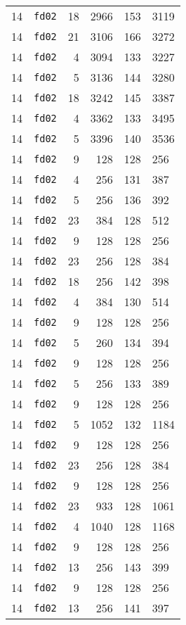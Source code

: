 \documentclass{article}
\begin{document}
\begin{table}[h!]
\begin{tabular}{llrrrl}
    14 & \texttt{fd02} & 18 & 2966 & 153 & 3119 \\
    14 & \texttt{fd02} & 21 & 3106 & 166 & 3272 \\
    14 & \texttt{fd02} & 4 & 3094 & 133 & 3227 \\
    14 & \texttt{fd02} & 5 & 3136 & 144 & 3280 \\
    14 & \texttt{fd02} & 18 & 3242 & 145 & 3387 \\
    14 & \texttt{fd02} & 4 & 3362 & 133 & 3495 \\
    14 & \texttt{fd02} & 5 & 3396 & 140 & 3536 \\
    14 & \texttt{fd02} & 9 & 128 & 128 & 256 \\
    14 & \texttt{fd02} & 4 & 256 & 131 & 387 \\
    14 & \texttt{fd02} & 5 & 256 & 136 & 392 \\
    14 & \texttt{fd02} & 23 & 384 & 128 & 512 \\
    14 & \texttt{fd02} & 9 & 128 & 128 & 256 \\
    14 & \texttt{fd02} & 23 & 256 & 128 & 384 \\
    14 & \texttt{fd02} & 18 & 256 & 142 & 398 \\
    14 & \texttt{fd02} & 4 & 384 & 130 & 514 \\
    14 & \texttt{fd02} & 9 & 128 & 128 & 256 \\
    14 & \texttt{fd02} & 5 & 260 & 134 & 394 \\
    14 & \texttt{fd02} & 9 & 128 & 128 & 256 \\
    14 & \texttt{fd02} & 5 & 256 & 133 & 389 \\
    14 & \texttt{fd02} & 9 & 128 & 128 & 256 \\
    14 & \texttt{fd02} & 5 & 1052 & 132 & 1184 \\
    14 & \texttt{fd02} & 9 & 128 & 128 & 256 \\
    14 & \texttt{fd02} & 23 & 256 & 128 & 384 \\
    14 & \texttt{fd02} & 9 & 128 & 128 & 256 \\
    14 & \texttt{fd02} & 23 & 933 & 128 & 1061 \\
    14 & \texttt{fd02} & 4 & 1040 & 128 & 1168 \\
    14 & \texttt{fd02} & 9 & 128 & 128 & 256 \\
    14 & \texttt{fd02} & 13 & 256 & 143 & 399 \\
    14 & \texttt{fd02} & 9 & 128 & 128 & 256 \\
    14 & \texttt{fd02} & 13 & 256 & 141 & 397 \\

\end{tabular}
\end{table}
\end{document}
